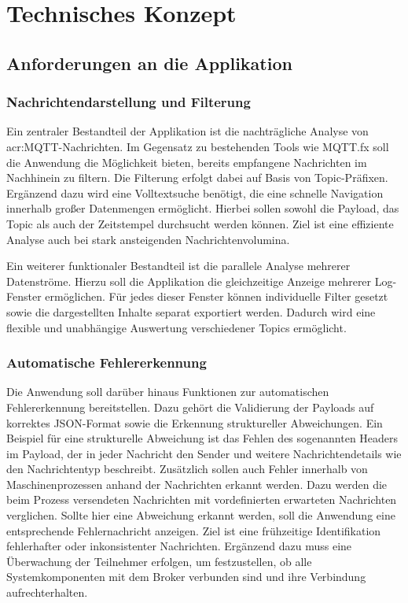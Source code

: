 \chapter{Technisches Konzept}
\label{cha:Technisches Konzept}

\section{Anforderungen an die Applikation}
\subsection{Nachrichtendarstellung und Filterung}
Ein zentraler Bestandteil der Applikation ist die nachträgliche Analyse von 
\acrshort{acr:MQTT}-Nachrichten. Im Gegensatz zu bestehenden Tools wie MQTT.fx soll die 
Anwendung die Möglichkeit bieten, bereits empfangene Nachrichten im 
Nachhinein zu filtern. Die Filterung erfolgt dabei auf Basis von 
Topic-Präfixen. Ergänzend dazu wird eine Volltextsuche benötigt, die eine 
schnelle Navigation innerhalb großer Datenmengen ermöglicht. Hierbei sollen 
sowohl die Payload, das Topic als auch der Zeitstempel durchsucht werden 
können. Ziel ist eine effiziente Analyse auch bei stark ansteigenden 
Nachrichtenvolumina.

Ein weiterer funktionaler Bestandteil ist die parallele Analyse mehrerer 
Datenströme. Hierzu soll die Applikation die gleichzeitige Anzeige mehrerer 
Log-Fenster ermöglichen. Für jedes dieser Fenster können individuelle Filter 
gesetzt sowie die dargestellten Inhalte separat exportiert werden. Dadurch 
wird eine flexible und unabhängige Auswertung verschiedener Topics 
ermöglicht.

\subsection{Automatische Fehlererkennung}
Die Anwendung soll darüber hinaus Funktionen zur automatischen 
Fehlererkennung bereitstellen. Dazu gehört die Validierung der Payloads auf 
korrektes JSON-Format sowie die Erkennung struktureller Abweichungen. Ein Beispiel für eine strukturelle Abweichung ist das Fehlen des sogenannten Headers im Payload, der in jeder Nachricht den Sender und weitere Nachrichtendetails wie den Nachrichtentyp beschreibt.
Zusätzlich sollen auch Fehler innerhalb von Maschinenprozessen anhand der Nachrichten erkannt werden. Dazu werden die beim Prozess versendeten Nachrichten mit vordefinierten erwarteten Nachrichten verglichen. Sollte hier eine Abweichung erkannt werden, soll die Anwendung eine entsprechende Fehlernachricht anzeigen. Ziel ist eine frühzeitige 
Identifikation fehlerhafter oder inkonsistenter Nachrichten. Ergänzend dazu 
muss eine Überwachung der Teilnehmer erfolgen, um festzustellen, ob alle Systemkomponenten mit dem Broker verbunden sind und ihre Verbindung aufrechterhalten.

